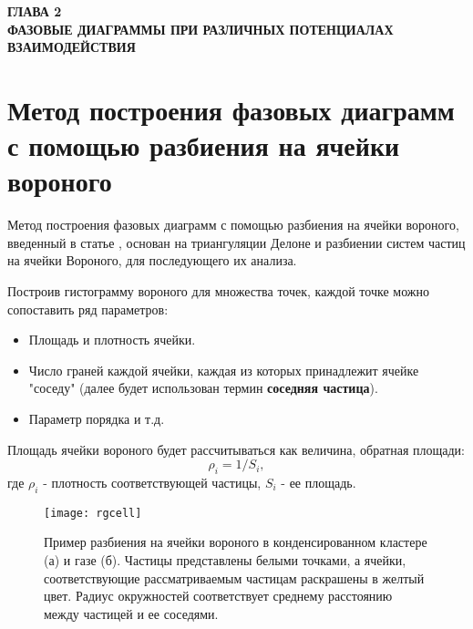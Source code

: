 
\newpage
\begin{center}
\textbf{ГЛАВА 2}\\
\textbf{ФАЗОВЫЕ ДИАГРАММЫ ПРИ РАЗЛИЧНЫХ ПОТЕНЦИАЛАХ ВЗАИМОДЕЙСТВИЯ}
\end{center}


\section{Метод построения фазовых диаграмм с помощью разбиения на ячейки вороного}\label{C2_1}

Метод построения фазовых диаграмм с помощью разбиения на ячейки вороного, введенный в статье \cite{Ovcharov2017}, основан на триангуляции Делоне и разбиении систем частиц на ячейки Вороного, для последующего их анализа.

Построив гистограмму вороного для множества точек, каждой точке можно сопоставить ряд параметров:

\begin{itemize}
\item Площадь и плотность ячейки.
\item Число граней каждой ячейки, каждая из которых принадлежит ячейке "соседу" (далее будет использован термин \textbf{соседняя частица}).
\item Параметр порядка и т.д.
\end{itemize}

Площадь ячейки вороного будет рассчитываться как величина, обратная площади:
\begin{equation}
\rho_i = 1 / S_i,
\label{eqRho}
\end{equation}
где $\rho_i$ - плотность соответствующей частицы, $S_i$ - ее площадь.

\begin{figure}[htbp!]
\begin{center}
\texttt{[image: rgcell]}
\caption{Пример разбиения на ячейки вороного в конденсированном кластере (а) и газе (б). Частицы представлены белыми точками, а ячейки, соответствующие рассматриваемым частицам раскрашены в желтый цвет. Радиус окружностей соответствует среднему расстоянию между частицей и ее соседями.}
\label{risFlucMed}
\end{center}
\end{figure}

